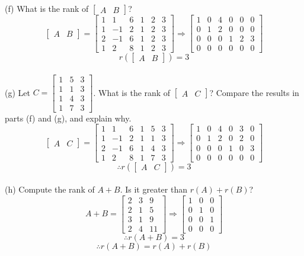 (f) What is the rank of $\begin{bmatrix}
    A & B
\end{bmatrix}$?
$$\begin{bmatrix}
    A&B
\end{bmatrix}=\begin{bmatrix}
    1&1&6&1&2&3\\
    1&-1&2&1&2&3\\
    2&-1&6&1&2&3\\
    1&2&8&1&2&3
\end{bmatrix}\Rightarrow\begin{bmatrix}
    1&0&4&0&0&0\\
    0&1&2&0&0&0\\
    0&0&0&1&2&3\\
    0&0&0&0&0&0
\end{bmatrix}$$
$$r\left(\begin{bmatrix}
    A&B
\end{bmatrix}\right)=3$$\\

(g) Let $C=\begin{bmatrix}
    1&5&3\\
    1&1&3\\1&4&3\\1&7&3
\end{bmatrix}$. What is the rank of $\begin{bmatrix}
    A&C
\end{bmatrix}$? Compare the results in parts (f) and (g), and explain why.
$$\begin{bmatrix}
    A&C
\end{bmatrix}=\begin{bmatrix}
    1&1&6&1&5&3\\
    1&-1&2&1&1&3\\
    2&-1&6&1&4&3\\
    1&2&8&1&7&3
\end{bmatrix}\Rightarrow\begin{bmatrix}
    1&0&4&0&3&0\\
    0&1&2&0&2&0\\
    0&0&0&1&0&3\\
    0&0&0&0&0&0
\end{bmatrix}$$
$$\therefore r\left(\begin{bmatrix}
    A&C
\end{bmatrix}\right)=3$$\\

(h) Compute the rank of $A+B$. Is it greater than $r(A) + r(B)$?
$$A+B=\begin{bmatrix}
    2&3&9\\2&1&5\\3&1&9\\2&4&11
\end{bmatrix}\Rightarrow\begin{bmatrix}
    1&0&0\\
    0&1&0\\
    0&0&1\\
    0&0&0
\end{bmatrix}$$
$$\therefore r(A+B) = 3$$
$$\therefore r(A+B) = r(A)+r(B)$$\\

